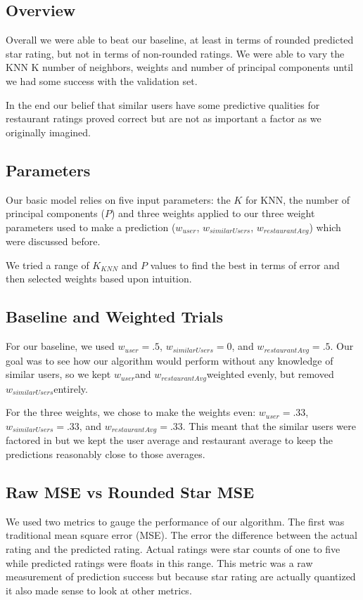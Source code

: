 \documentclass[10pt,twocolumn,letterpaper]{article}
\newcommand{\wu}{\ensuremath{w_{user}}}
\newcommand{\ws}{\ensuremath{w_{similarUsers}}}
\newcommand{\wrst}{\ensuremath{w_{restaurantAvg}}}
\begin{document}
\subsection{Overview}
Overall we were able to beat our baseline, at least in terms of rounded predicted star rating, but not in terms of non-rounded ratings. We were able to vary the KNN K number of neighbors, weights and number of principal components until we had some success with the validation set.

In the end our belief that similar users have some predictive qualities for restaurant ratings proved correct but are not as important a factor as we originally imagined.

\subsection{Parameters}
Our basic model relies on five input parameters: the $K$ for KNN, the number of principal components ($P$) and three weights applied to our three weight parameters used to make a prediction (\wu, \ws, \wrst) which were discussed before.

We tried a range of $K_{KNN}$ and $P$ values to find the best in terms of error and then selected weights based upon intuition.

\subsection{Baseline and Weighted Trials}

For our baseline, we used $\wu=.5$, $\ws=0$, and $\wrst=.5$. Our goal was to see how our algorithm would perform without any knowledge of similar users, so we kept \wu and \wrst weighted evenly, but removed \ws entirely.

For the three weights, we chose to make the weights even: $\wu=.33$, $\ws=.33$, and $\wrst=.33$. This meant that the similar users were factored in but we kept the user average and restaurant average to keep the predictions reasonably close to those averages.

\subsection{Raw MSE vs Rounded Star MSE}
We used two metrics to gauge the performance of our algorithm. The first was traditional mean square error (MSE). The error the difference between the actual rating and the predicted rating. Actual ratings were star counts of one to five while predicted ratings were floats in this range. This metric was a raw measurement of prediction success but because star rating are actually quantized it also made sense to look at other metrics.
\end{document}
